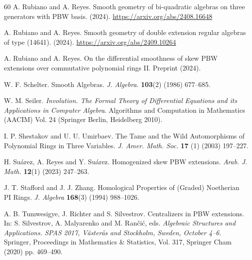 \documentclass{amsart}
\theoremstyle{definition}
\theoremstyle{remark}
\numberwithin{equation}{section}
\begin{document}
\begin{thebibliography}{60}
 A. Rubiano and A. Reyes. Smooth geometry of bi-quadratic algebras on three generators with PBW basis. (2024). \url{https://arxiv.org/abs/2408.16648}

 A. Rubiano and A. Reyes. Smooth geometry of double extension regular algebras of type (14641). (2024). \url{https://arxiv.org/abs/2409.10264}

 A. Rubiano and A. Reyes. On the differential smoothness of skew PBW extensions over commutative polynomial rings II. Preprint (2024).

 W. F. Schelter. Smooth {A}lgebras. {\em J. Algebra.} {\bf 103}(2) (1986) 677--685.

 W. M. Seiler. {\em Involution. {T}he {F}ormal {T}heory of {D}ifferential {E}quations and its {A}pplications in {C}omputer {A}lgebra}. Algorithms and Computation in Mathematics (AACIM) Vol. 24 (Springer Berlin, Heidelberg 2010).

 I. P. Shestakov and U. U. Umirbaev. The Tame and the Wild Automorphisms of Polynomial Rings in Three Variables. {\em J. Amer. Math. Soc.} {\bf 17} (1) (2003) 197--227.





 H. Su\'arez, A. Reyes and Y. Su\'arez. Homogenized skew PBW extensions. {\em Arab. J. Math.} {\bf 12}(1) (2023) 247--263.

 J. T. Stafford and J. J. Zhang. Homological Properties of (Graded) Noetherian PI Rings. {\em J. Algebra} {\bf 168}(3) (1994) 988--1026.

 A. B. Tumwesigye, J. Richter and S. Silvestrov. Centralizers in PBW extensions. In: S. Silvestrov, A. Malyarenko and M. Ran\v{c}i\'c, eds. {\em Algebraic Structures and Applications. SPAS 2017, V\"aster\aa s and Stockholm, Sweden, October 4--6}. Springer, Proceedings in Mathematics \& Statistics, Vol. 317, Springer Cham (2020) pp. 469--490.


\end{thebibliography}
\end{document}
